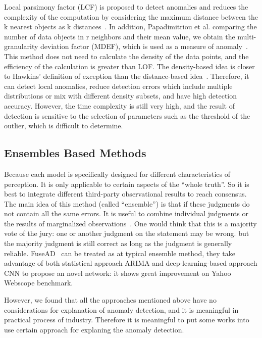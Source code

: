Local parsimony factor (LCF) is proposed to
detect anomalies and reduces the complexity of the
computation by considering the maximum distance between
the k nearest objects as k distances~\cite{agyemang2004algorithm}.
In addition,
Papadimitriou et al. comparing the number of data objects in r neighbors and their mean value,
we obtain the multi-granularity deviation factor (MDEF),
which is used as a measure of anomaly~\cite{papadimitriou2003loci}.
This method does not need to calculate the density of the data points,
and the efficiency of the calculation is greater than LOF.
The density-based idea is closer to Hawkins' definition of
exception than the distance-based idea~\cite{hawkins1980identification}.
Therefore,
it can detect local anomalies,
reduce detection errors which include multiple
distributions or mix with different density subsets,
and have high detection accuracy.
However,
the time complexity is still very high,
and the result of detection  is sensitive to
the selection of parameters such as the threshold of the outlier,
which is difficult to determine.

\subsection{Ensembles Based Methods}

Because each model is specifically designed
for different characteristics of perception.
It is only applicable to certain aspects of
the ``whole truth''.
So it is best to integrate different
third-party observational results to reach consensus.
The main idea of this method (called ``ensemble'')
is that if these judgments do not contain all the same errors.
It is useful to combine individual judgments or
the results of marginalized observations~\cite{zhou2012ensemble}.
One would think that this is a majority vote of
the jury:
one or another judgment on the statement may be wrong.
but the majority judgment is still correct as long as
the judgment is generally reliable.
FuseAD~\cite{munir2019fusead} can be treated as
at typical ensemble method, 
they take advantage of both statistical approach ARIMA 
and deep-learning-based approach 
CNN to propose an novel network: 
it shows great improvement on Yahoo Webscope benchmark.

However, 
we found that all the approaches mentioned above 
have no considerations for explanation of anomaly detection, 
and it is meaningful in practical process of industry. 
Therefore it is meaningful to put some works into use 
certain approach for explaning the  anomaly detection.


